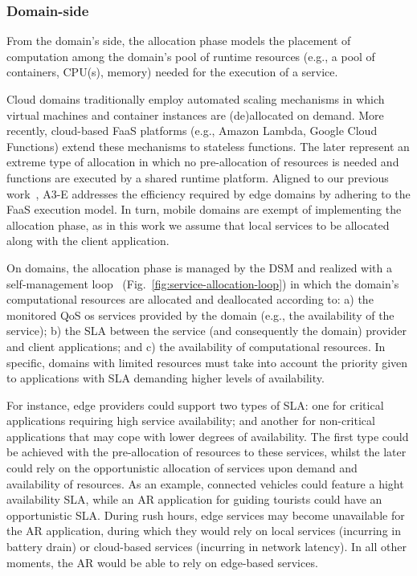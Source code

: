 \subsubsection*{Domain-side} From the domain's side, the allocation phase models the placement of computation among the domain's pool of runtime resources (e.g., a pool of containers, CPU(s), memory) needed for the execution of a service. 

Cloud domains traditionally employ automated scaling mechanisms in which virtual machines and container instances are (de)allocated on demand. More recently, cloud-based FaaS platforms (e.g., Amazon Lambda, Google Cloud Functions) extend these mechanisms to stateless functions. The later represent an extreme type of allocation in which no pre-allocation of resources is needed and functions are executed by a shared runtime platform. Aligned to our previous work~\cite{GarrigaMendonca2017}, A3-E addresses the efficiency required by edge domains by adhering to the FaaS execution model.
In turn, mobile domains are exempt of implementing the allocation phase, as in this work we assume that local services to be allocated along with the client application.

On domains, the allocation phase is managed by the DSM and realized with a self-management loop~\cite{kephart2003vision} (Fig.~\ref{fig:service-allocation-loop}) in which the domain's computational resources are allocated and deallocated according to: a) the monitored QoS os services provided by the domain (e.g., the availability of the service); b) the SLA between the service (and consequently the domain) provider and client applications; and c) the availability of computational resources. In specific, domains with limited resources must take into account the priority given to applications with SLA demanding higher levels of availability. 

For instance, edge providers could support two types of SLA: one for critical applications requiring high service availability; and another for non-critical applications that may cope with lower degrees of availability. The first type could be achieved with the pre-allocation of resources to these services, whilst the later could rely on the opportunistic allocation of services upon demand and availability of resources. As an example, connected vehicles could feature a hight availability SLA, while an AR application for guiding tourists could have an opportunistic SLA. During rush hours, edge services may become unavailable for the AR application, during which they would rely on local services (incurring in battery drain) or cloud-based services (incurring in network latency). In all other moments, the AR would be able to rely on edge-based services. 

